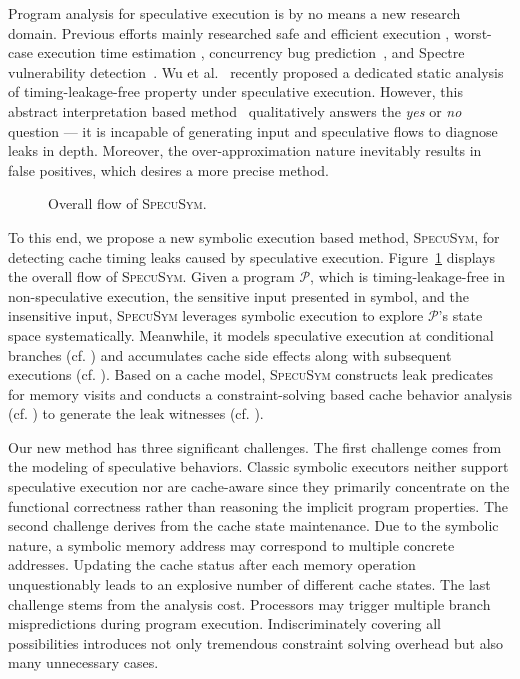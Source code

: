 \documentclass[sigconf,screen]{acmart}
\newcommand*\circled[1]{\tikz[baseline=(char.base)]{
				\node[shape=circle,draw,inner sep=1pt] (char) {\scriptsize{#1}};}}
\newcommand{\prog}{\mathcal{P}}
\begin{document}
Program analysis for speculative execution is by no means a new research domain. 
Previous efforts mainly researched safe and efficient execution
\cite{ChenLDHY04,PrabhuRV10,GuarnieriKMRS19}, worst-case execution time estimation
\cite{LiMR03,LiMR05}, concurrency bug prediction~\cite{ChenWYS09,LiELS05}, and 
Spectre vulnerability detection~\cite{GuarnieriKMRS19,OleksenkoTSF19,WangCBMR19}. 
Wu et al.~\cite{WuW19} recently proposed a dedicated static  analysis of 
timing-leakage-free property under speculative execution. However, this abstract 
interpretation based method~\cite{WuW19} qualitatively answers the \textit{yes} or 
\textit{no} question --- it is incapable of generating input and speculative flows 
to diagnose leaks in depth. Moreover, the over-approximation nature inevitably 
results in false positives, which desires a more precise method.


\begin{figure}
  \centering
  \scalebox{1.0}{}
  \caption{Overall flow of \textsc{SpecuSym}.}
  \label{fig:overall_flow}
	\vspace{-2ex}
\end{figure}


To this end, we propose a new symbolic execution based method, \textsc{SpecuSym}, 
for detecting cache timing leaks caused by speculative 
execution. Figure~\ref{fig:overall_flow} displays the overall flow of 
\textsc{SpecuSym}. Given a program $\prog$, which is timing-leakage-free in 
non-speculative execution, the sensitive input presented in symbol, and the 
insensitive input, \textsc{SpecuSym} leverages symbolic execution to explore 
$\prog$'s state space systematically. Meanwhile, it models speculative execution 
at conditional branches (cf. \circled{1}) and accumulates cache side effects
along with subsequent executions (cf. \circled{2}). Based on a cache model, 
\textsc{SpecuSym} constructs leak predicates for memory visits and conducts a 
constraint-solving based cache behavior analysis (cf. \circled{3}) to generate 
the leak witnesses (cf. \circled{4}). 


Our new method has three significant challenges. The first challenge comes from 
the modeling of speculative behaviors. Classic symbolic executors
\cite{CadarDE08,PasareanuR10} 
neither support speculative execution nor are cache-aware since they primarily 
concentrate on the functional correctness rather than reasoning the implicit 
program properties. 
%
The second challenge derives from the cache state maintenance. Due to the symbolic 
nature, a symbolic memory address may correspond to multiple concrete addresses. 
Updating the cache status after each memory operation unquestionably leads to an
explosive number of different cache states. 
%
The last challenge stems from the analysis cost. Processors may trigger multiple 
branch mispredictions during program execution. Indiscriminately covering all 
possibilities introduces not only tremendous constraint solving overhead but also 
many unnecessary cases. 
\end{document}
